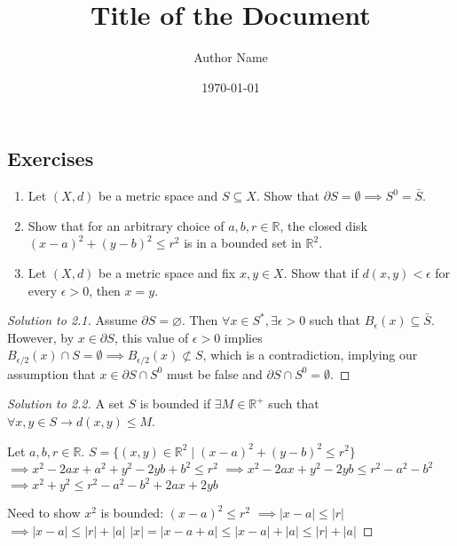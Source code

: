 \documentclass{article}
\title{\textbf{Title of the Document}}
\author{Author Name}
\date{\today}
\theoremstyle{definition}
\numberwithin{equation}{section}
\begin{document}
\maketitle
\tableofcontents
\newpage
\subsection{Exercises}

\begin{enumerate}
    \item[2.1.] Let $(X,d)$ be a metric space and $S \subseteq X$. Show that $\partial S = \emptyset \implies S^0 = \bar{S}$.
    \item[2.2.] Show that for an arbitrary choice of $a,b,r \in \mathbb{R}$, the closed disk $(x - a)^2 + (y - b)^2 \leq r^2$ is in a bounded set in $\mathbb{R}^2$.
    \item[2.3.] Let $(X,d)$ be a metric space and fix $x,y \in X$. Show that if $d(x,y) < \epsilon$ for every $\epsilon > 0$, then $x = y$.
\end{enumerate}

\begin{proof}[Solution to 2.1]
Assume $ \partial S = \varnothing $. Then $\forall x \in S^*, \exists \epsilon > 0$ such that $B_\epsilon (x) \subseteq \bar{S}$. However, by $x \in \partial S$, this value of $\epsilon > 0$ implies $B_{\epsilon/2} (x) \cap S = \emptyset \implies B_{\epsilon/2} (x) \not\subset S$, which is a contradiction, implying our assumption that $x \in \partial S \cap S^0$ must be false and $\partial S \cap S^0 = \emptyset $.
\end{proof}

\begin{proof}[Solution to 2.2]
A set $S$ is bounded if $\exists M \in \mathbb{R}^{+}$ such that $\forall x,y \in S \rightarrow d(x,y) \leq M$.

Let $a,b,r \in \mathbb{R}$.
$
S = \{ (x,y) \in \mathbb{R}^2 \mid (x-a)^2 + (y-b)^2 \leq r^2 \}
$
$
\implies x^2 - 2ax + a^2 + y^2 - 2yb + b^2 \leq r^2 
$
$
\implies x^2 - 2ax + y^2 - 2yb \leq r^2 - a^2 - b^2 
$
$
\implies x^2 + y^2 \leq r^2 - a^2 - b^2 + 2ax + 2yb
$

Need to show $x^2$ is bounded:
$
(x - a)^2 \leq r^2 
$
$
\implies |x-a| \leq |r| 
$
$
\implies |x - a| \leq |r| + |a| 
$
$
|x| = |x - a + a| \leq |x - a| + |a| \leq |r| + |a| 
$
\end{proof}
\end{document}
